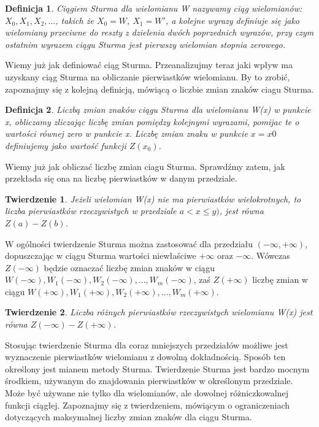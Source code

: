 \documentclass[twoside,a4paper]{book}
\newtheorem{theorem}{Twierdzenie}
\newtheorem{definition}{Definicja}
\begin{document}
\begin{definition}
	Ciągiem Sturma dla wielomianu W nazywamy ciąg wielomianów: $X_0, X_1, X_2,...$, takich że $X_0=W$, $X_1=W'$, a kolejne wyrazy definiuje się jako wielomiany przeciwne do reszty z dzielenia dwóch poprzednich wyrazów, przy czym ostatnim wyrazem ciągu Sturma jest pierwszy wielomian stopnia zerowego. 
\end{definition}

Wiemy już jak definiować ciąg Sturma. Przeanalizujmy teraz jaki wpływ ma uzyskany ciąg Sturma na obliczanie pierwiastków wielomianu. By to zrobić, zapoznajmy się z kolejną definicją, mówiącą o liczbie zmian znaków ciagu Sturma.

\begin{definition}
	Liczbą zmian znaków ciągu Sturma dla wielomianu W(x) w punkcie x, obliczamy zliczając liczbę zmian pomiędzy kolejnymi wyrazami, pomijac te o wartości równej zero w punkcie x. Liczbę zmian znaku w punkcie $x=x0$ definiujemy jako wartość funkcji $Z(x_0)$.
\end{definition}

Wiemy już jak obliczać liczbę zmian ciagu Sturma. Sprawdźmy zatem, jak przekłada się ona na liczbę pierwiastków w danym przedziale.

\begin{theorem}
	Jeżeli wielomian W(x) nie ma pierwiastków wielokrotnych, to liczba pierwiastków rzeczywistych w przedziale $a<x\le y)$, jest równa $Z(a) - Z(b)$.
\end{theorem}

W ogólności twierdzenie Sturma można zastosować dla przedziału $(-\infty,+\infty)$, dopuszczając w ciągu Sturma wartości niewłaściwe $+\infty$ oraz $-\infty$. Wówczas $Z(-\infty)$ będzie oznaczać liczbę zmian znaków w ciągu $W(-\infty), W_1(-\infty), W_2(-\infty),..., W_m(-\infty)$, zaś $Z(+\infty)$ liczbę zmian w ciągu $W(+\infty), W_1(+\infty), W_2(+\infty),..., W_m(+\infty)$.

\begin{theorem}
	Liczba różnych pierwiastków rzeczywistych wielomianu W(x) jest równa $Z(-\infty)-Z(+\infty)$.
\end{theorem}

Stosując twierdzenie Sturma dla coraz mniejszych przedziałów możliwe jest wyznaczenie pierwiastków wielomianu z dowolną dokładnością. Sposób ten określony jest mianem metody Sturma.
Twierdzenie Sturma jest bardzo mocnym środkiem, używanym do znajdowania pierwiastków w określonym przedziale. Może być używane nie tylko dla wielomianów, ale dowolnej różniczkowalnej funkcji ciągłej. Zapoznajmy się z twierdzeniem, mówiącym o ograniczeniach dotyczących maksymalnej liczby zmian znaków dla ciągu Sturma.
\end{document}
